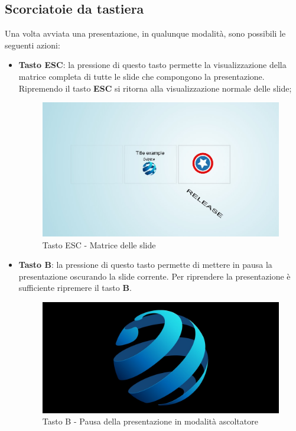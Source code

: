 \subsection{Scorciatoie da tastiera}
\noindent Una volta avviata una presentazione, in qualunque modalità, sono possibili le seguenti azioni:
\begin{itemize}
	\item \textbf{Tasto ESC}: la pressione di questo tasto permette la visualizzazione della matrice completa di tutte le slide che compongono la presentazione. Ripremendo il tasto \textbf{ESC} si ritorna alla visualizzazione normale delle slide;
	\begin{figure}[H] 
		\centering 
		\includegraphics[scale=0.40] {img/anteprima}
		\caption{Tasto ESC - Matrice delle slide} 
	\end{figure}
	\item \textbf{Tasto B}: la pressione di questo tasto permette di mettere in pausa la presentazione oscurando la slide corrente. Per riprendere la presentazione è sufficiente ripremere il tasto \textbf{B}.
	\begin{figure}[H] 
		\centering 
		\includegraphics[scale=0.20] {img/b}
		\caption{Tasto B - Pausa della presentazione in modalità ascoltatore} 
	\end{figure}
	

\end{itemize}
